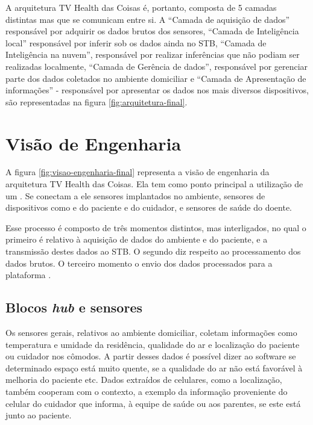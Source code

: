 A arquitetura TV Health das Coisas é, portanto, composta de 5 camadas distintas mas que se comunicam
entre si. A ``Camada de aquisição de
dados'' responsável por adquirir os dados brutos dos sensores, ``Camada de
Inteligência local'' responsável por inferir sob os dados ainda no
STB, ``Camada de Inteligência na nuvem'', responsável por realizar
inferências que não podiam ser realizadas localmente, ``Camada de Gerência
de dados'', responsável por gerenciar parte dos dados coletados no ambiente
domiciliar e ``Camada de Apresentação de informações'' - responsável por
apresentar os dados nos mais diversos dispositivos, são representadas na figura
\ref{fig:arquitetura-final}.


\section{Visão de Engenharia} \label{sec:visao-engenharia}

A figura \ref{fig:visao-engenharia-final} representa a visão de engenharia da arquitetura
TV Health das Coisas. Ela tem como ponto principal a utilização de um \stb[]. Se
conectam a ele sensores implantados no ambiente, sensores de dispositivos como
\smartphones[] e  \smartwatches[] do paciente e do cuidador, e sensores de saúde 
do doente.

Esse processo é composto de três momentos distintos, mas interligados, no qual
o primeiro é relativo à aquisição de dados do ambiente e do paciente, e a
transmissão destes dados ao STB. O segundo diz respeito ao processamento dos
dados brutos. O terceiro momento o envio dos dados processados para a plataforma
\nextsaude[].


\subsection{Blocos \textit{hub} e sensores}

Os sensores gerais, relativos ao ambiente domiciliar, coletam
informações como  temperatura e umidade da residência, qualidade do ar e
localização do paciente ou cuidador nos cômodos. A partir desses dados é
possível dizer ao software se determinado espaço está muito quente, se a
qualidade do ar não está favorável à melhoria do paciente etc. Dados extraídos
de celulares, como a localização, também cooperam com o contexto, a exemplo da
informação proveniente do celular do cuidador que informa, à equipe de saúde ou
aos parentes, se este está junto ao paciente.

